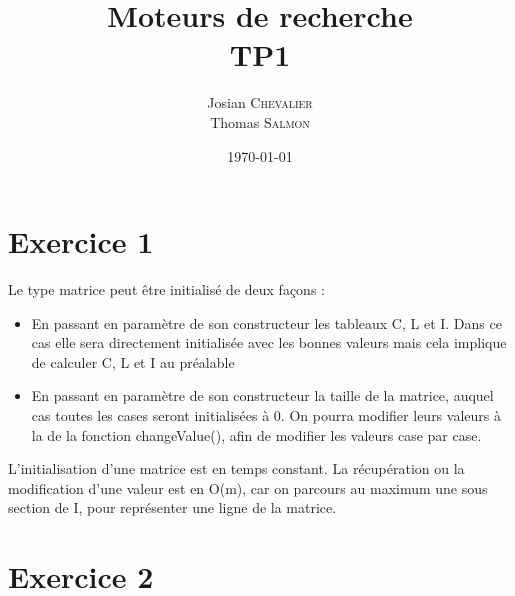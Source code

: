 \documentclass{article}
\title{Moteurs de recherche \\ TP1} %
\author{Josian \textsc{Chevalier}\\Thomas \textsc{Salmon}} %
\date{\today} %
\begin{document}
\maketitle %

\section{Exercice 1}

Le type matrice peut être initialisé de deux façons :
\begin{itemize}
	\item En passant en paramètre de son constructeur les tableaux C, L et I. Dans ce cas elle sera directement initialisée avec les bonnes valeurs mais cela implique de calculer C, L et I au préalable
	\item En passant en paramètre de son constructeur la taille de la matrice, auquel cas toutes les cases seront initialisées à 0. On pourra modifier leurs valeurs à la de la fonction changeValue(), afin de modifier les valeurs case par case.
\end{itemize}

L'initialisation d'une matrice est en temps constant. La récupération ou la modification d'une valeur est en O(m), car on parcours au maximum une sous section de I, pour représenter une ligne de la matrice.



\section{Exercice 2}
\end{document}
